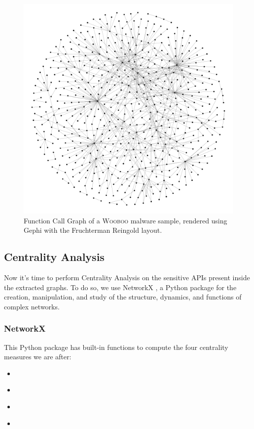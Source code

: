 \begin{figure}[H]
    \centering
    \includegraphics[width=0.8\linewidth]{Images/WoobooGraph.png}
    \caption{Function Call Graph of a \textsc{Wooboo} malware sample, rendered using Gephi with the Fruchterman Reingold layout.}
    \label{fig:WoobooGraph}
\end{figure}

\subsection{Centrality Analysis}
Now it's time to perform Centrality Analysis on the sensitive APIs present inside the extracted graphs. To do so, we use NetworkX \cite{hagberg2008exploring}, a Python package for the creation, manipulation, and study of the structure, dynamics, and functions of complex networks.

\subsubsection{NetworkX}
This Python package has built-in functions to compute the four centrality measures we are after:

\begin{itemize}
    \item{} \\
    \item{} \\
    \item{} \\
    \item{}
\end{itemize}

